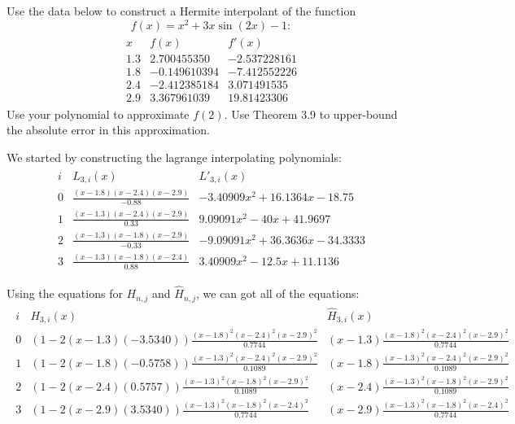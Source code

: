 \documentclass[12 pt, letterpaper]{exam}
\theoremstyle{definition}
\begin{document}
\begin{questions}
\question[50] Use the data below to construct a Hermite interpolant of the function $$f(x) = x^2+3x\sin(2x)-1:$$
\begin{align*}
\begin{array}{l|rrl}
x	&	f(x)		&	f'(x)		\\
\hline
1.3	&	 2.700455350	&	 -2.537228161	\\
1.8	&	-0.149610394	&	 -7.412552226	\\
2.4	&	-2.412385184	&	  3.071491535	\\
2.9	&	 3.367961039	&	19.81423306	
\end{array}
\end{align*}
Use your polynomial to approximate $f(2)$.  Use Theorem 3.9 to upper-bound the absolute error in this approximation.
\begin{solution}
    We started by constructing the lagrange interpolating polynomials:
    \begin{align*}
        \begin{array}{l|rrl}
            i	&	L_{3, i}(x)		&	L'_{3, i}(x)		\\
            \hline
            0	&	\frac{(x-1.8)(x-2.4)(x-2.9)}{-0.88}	&    -3.40909x^2 + 16.1364x - 18.75	    \\
            1	&	\frac{(x-1.3)(x-2.4)(x-2.9)}{0.33}	&	 9.09091x^2 - 40x + 41.9697	\\
            2	&   \frac{(x-1.3)(x-1.8)(x-2.9)}{-0.33}	&	 -9.09091x^2 + 36.3636x - 34.3333	\\
            3	&	\frac{(x-1.3)(x-1.8)(x-2.4)}{0.88}	&	 3.40909x^2 - 12.5x + 11.1136
        \end{array}
    \end{align*}

    Using the equations for $H_{n,j}$ and $\hat{H}_{n,j}$, we can got all of the equations:
    \begin{align*}
        \begin{array}{l|rrl}
            i	&	H_{3, i}(x)		&	\hat{H}_{3, i}(x)		\\
            \hline
            0	&	(1-2(x-1.3)(-3.5340))\frac{(x-1.8)^2(x-2.4)^2(x-2.9)^2}{0.7744}   & (x-1.3)\frac{(x-1.8)^2(x-2.4)^2(x-2.9)^2}{0.7744}  \\
            1	&	(1-2(x-1.8)(-0.5758))\frac{(x-1.3)^2(x-2.4)^2(x-2.9)^2}{0.1089}	& (x-1.8)\frac{(x-1.3)^2(x-2.4)^2(x-2.9)^2}{0.1089}  \\
            2	&   (1-2(x-2.4)(0.5757))\frac{(x-1.3)^2(x-1.8)^2(x-2.9)^2}{0.1089}	& (x-2.4)\frac{(x-1.3)^2(x-1.8)^2(x-2.9)^2}{0.1089} \\
            3	&	(1-2(x-2.9)(3.5340))\frac{(x-1.3)^2(x-1.8)^2(x-2.4)^2}{0.7744}	& (x-2.9)\frac{(x-1.3)^2(x-1.8)^2(x-2.4)^2}{0.7744}	
        \end{array}
    \end{align*}


\end{solution}
\end{questions}
\end{document}
